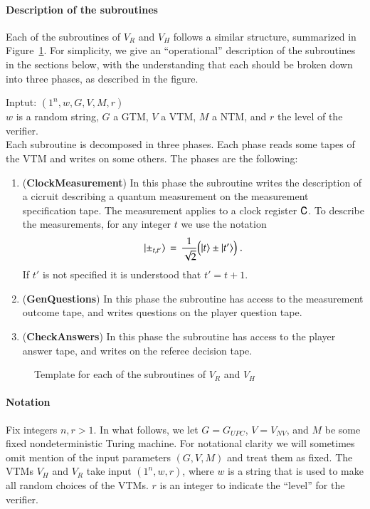 \paragraph{Description of the subroutines}

Each of the subroutines of $V_R$ and $V_H$ follows a similar structure, summarized in Figure~\ref{fig:check_structure}. For simplicity, we give an ``operational'' description of the subroutines in the sections below, with the understanding that each should be broken down into three phases, as described in the figure.

\vspace{10pt}
\begin{center}
\begin{mdframed}
Inptut: $(1^n,w,G,V,M,r)$\\
  $w$ is a random string, $G$ a GTM, $V$ a VTM, $M$ a NTM, and $r$ the level of the verifier.\\
Each subroutine is decomposed in three phases. Each phase reads some tapes of the VTM and writes on some others. The phases are the following: 
	\begin{enumerate}
		\item (\textbf{ClockMeasurement}) In this phase the subroutine writes the description of a cicruit describing a quantum measurement on the measurement specification tape. The measurement applies to a clock register ${\mathsf{C}}$. To describe the measurements, for any integer $t$ we use the notation 
$$|\pm_{t,t'}\rangle \,=\, \frac{1}{\sqrt{2}}\big(|t\rangle\pm|t'\rangle\big)\;.$$
If $t'$ is not specified it is understood that $t'=t+1$.
	\item (\textbf{GenQuestions}) In this phase the subroutine has access to the measurement outcome tape, and writes questions on the player question tape. 
	\item (\textbf{CheckAnswers}) In this phase the subroutine has access to the player answer tape, and writes on the referee decision tape. 
	\end{enumerate}    
\end{mdframed}

\end{center}
\begin{figure}[H]
\caption{Template for each of the subroutines of $V_R$ and $V_H$}
\label{fig:check_structure}
\end{figure}

\paragraph{Notation} 
Fix integers $n, r > 1$. In what follows, we let $G = G_{UPC}$, $V = V_{NV}$, and $M$ be some fixed nondeterministic Turing machine. For notational clarity we will sometimes omit mention of the input parameters $(G,V,M)$ and treat them as fixed. The VTMs $V_H$ and $V_R$ take input $(1^n,w,r)$, where $w$ is a string that is used to make all random choices of the VTMs. $r$ is an integer to indicate the ``level'' for the verifier. 


